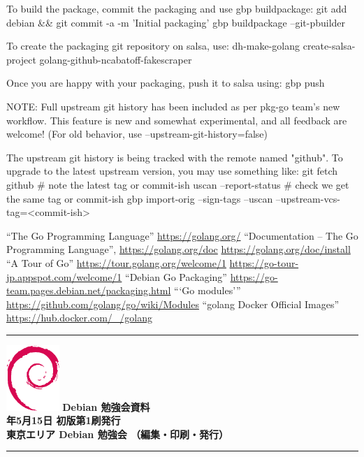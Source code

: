 \documentclass[mingoth,a4paper]{jsarticle}
\newcommand{\debmtgyear}{2021}
\newcommand{\debmtgmonth}{5}
\newcommand{\debmtgdate}{15}
\begin{document}
\begin{commandline}
To build the package, commit the packaging and use gbp buildpackage:
    git add debian && git commit -a -m 'Initial packaging'
    gbp buildpackage --git-pbuilder

To create the packaging git repository on salsa, use:
    dh-make-golang create-salsa-project golang-github-ncabatoff-fakescraper

Once you are happy with your packaging, push it to salsa using:
    gbp push

NOTE: Full upstream git history has been included as per pkg-go team's
      new workflow.  This feature is new and somewhat experimental,
      and all feedback are welcome!
      (For old behavior, use --upstream-git-history=false)

The upstream git history is being tracked with the remote named "github".
To upgrade to the latest upstream version, you may use something like:
    git fetch github          # note the latest tag or commit-ish
    uscan --report-status     # check we get the same tag or commit-ish
    gbp import-orig --sign-tags --uscan --upstream-vcs-tag=<commit-ish>
 
\end{commandline}

\begin{thebibliography}{1}
  ``The Go Programming Language'' \url{https://golang.org/}
  ``Documentation -- The Go Programming Language'', \url{https://golang.org/doc}
  \url{https://golang.org/doc/install}
  ``A Tour of Go'' \url{https://tour.golang.org/welcome/1}
  \url{https://go-tour-jp.appspot.com/welcome/1}
  ``Debian Go Packaging'' \url{https://go-team.pages.debian.net/packaging.html}
  ```Go modules''' \url{https://github.com/golang/go/wiki/Modules}
  ``golang Docker Official Images'' \url{https://hub.docker.com/_/golang}
\end{thebibliography}



\mbox{}\newpage
\mbox{}\newpage

\vspace*{15cm}
\hrule
\vspace{2mm}
\includegraphics[width=2cm]{image-assets/openlogo-nd.eps}
\noindent \Large \bf Debian 勉強会資料\\
\noindent \normalfont \debmtgyear{}年\debmtgmonth{}月\debmtgdate{}日 \hspace{5mm}  初版第1刷発行\\
\noindent \normalfont 東京エリア Debian 勉強会 （編集・印刷・発行）\\
\hrule
\end{document}
